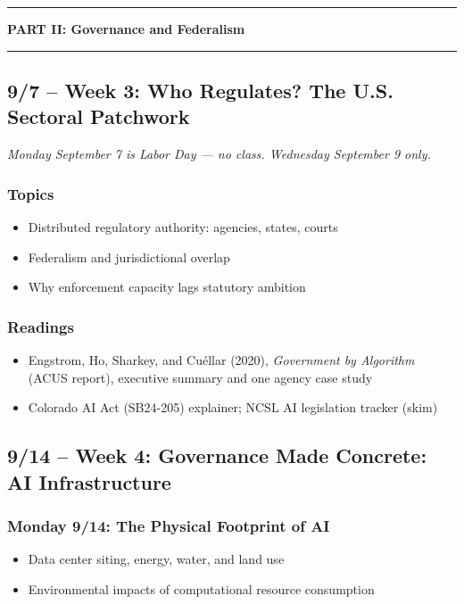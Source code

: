 \documentclass[12pt]{article}
\begin{document}
\bigskip
\noindent\rule{\textwidth}{0.6pt}
\begin{center}\textbf{PART II: Governance and Federalism}\end{center}
\noindent\rule{\textwidth}{0.6pt}

\subsection*{9/7 -- Week 3: Who Regulates? The U.S. Sectoral Patchwork}
\emph{Monday September 7 is Labor Day --- no class. Wednesday September 9 only.}
    \subsubsection*{Topics}
        \begin{itemize}
            \item Distributed regulatory authority: agencies, states, courts
            \item Federalism and jurisdictional overlap
            \item Why enforcement capacity lags statutory ambition
        \end{itemize}
    \subsubsection*{Readings}
        \begin{itemize}
            \item Engstrom, Ho, Sharkey, and Cu\'ellar (2020), \emph{Government by Algorithm} (ACUS report), executive summary and one agency case study
            \item Colorado AI Act (SB24-205) explainer; NCSL AI legislation tracker (skim)
        \end{itemize}

\subsection*{9/14 -- Week 4: Governance Made Concrete: AI Infrastructure}
    \subsubsection*{Monday 9/14: The Physical Footprint of AI}
        \begin{itemize}
            \item Data center siting, energy, water, and land use
            \item Environmental impacts of computational resource consumption
        \end{itemize}
\end{document}
